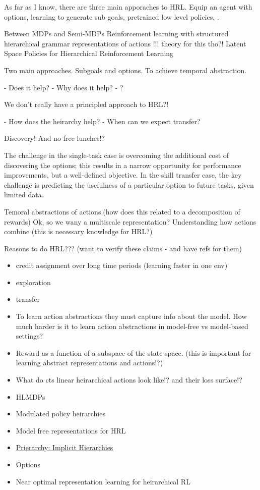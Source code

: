 As far as I know, there are three main apporaches to HRL.
Equip an agent with options, learning to generate sub goals, pretrained low level policies, .


Between MDPs and Semi-MDPs \cite{RichardS.SuttonaDoinaPrecupb1998}
Reinforcement learning with structured hierarchical grammar representations of actions  \cite{Christodoulou2019}  !!! theory for this tho?!
Latent Space Policies for Hierarchical Reinforcement Learning \cite{Haarnoja}

Two main approaches. Subgoals and options. To achieve temporal abstraction.

- Does it help?
- Why does it help?
- ?

We don't really have a principled approach to HRL?!

- How does the heirarchy help?
- When can we expect transfer?

Discovery! And no free lunches!?

\begin{displayquote}
  The challenge in the single-task case is overcoming the additional cost of discovering the options; this results in a narrow opportunity for performance improvements, but a well-defined objective. In the skill transfer case, the key challenge is predicting the usefulness of a particular option to future tasks, given limited data. \cite{Konidaris2019}
\end{displayquote}


Temoral abstractions of actions.(how does this related to a
decomposition of rewards) Ok, so we wany a multiscale representation?
Understanding how actions combine (this is necessary knowledge for HRL?)

Reasons to do HRL??? (want to verify these claims - and have refs for
them)

\begin{itemize}
\item
  credit assignment over long time periods (learning faster in one env)
\item
  exploration
\item
  transfer
\item
  To learn action abstractions they must capture info about the model.
  How much harder is it to learn action abstractions in model-free vs
  model-based settings?
\item
  Reward as a function of a subspace of the state space. (this is
  important for learning abstract representations and actions!?)
\item
  What do cts linear heirarchical actions look like!? and their loss
  surface!?
\item
  HLMDPs \cite{Saxea}
\item
  Modulated policy heirarchies \cite{Pashevich}
\item
  Model free representations for HRL \cite{Rafati}
\item
  \href{https://blog.aqnichol.com/2019/04/03/prierarchy-implicit-hierarchies/}{Prierarchy:
  Implicit Hierarchies}
\item
  Options
\item
  Near optimal representation learning for heirarchical RL \cite{Nachum2018}
\end{itemize}

